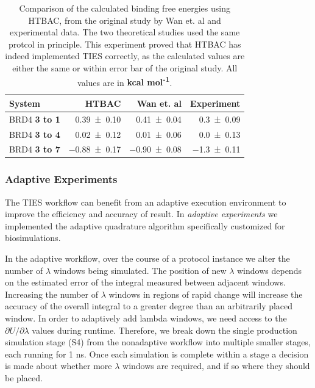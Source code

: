 \begin{table}
  \centering
  \begin{tabular}{l@{\hskip 1in}r@{\hskip 0.2in}r@{\hskip 0.2in}r}
    \toprule
    System & HTBAC & Wan et. al & Experiment \\
    \midrule
    BRD4 \textbf{3 to 1} & \num{0.39 +- 0.10} &   \num{0.41 +- 0.04} &  \num{0.3 +- 0.09} \\
    BRD4 \textbf{3 to 4} & \num{0.02 +- 0.12} &   \num{0.01 +- 0.06} &  \num{0.0 +- 0.13} \\
    BRD4 \textbf{3 to 7} & \num{-0.88 +- 0.17} &  \num{-0.90 +- 0.08} & \num{-1.3 +- 0.11} \\
    \bottomrule
  \end{tabular}

  \caption{Comparison of the calculated binding free energies using HTBAC, from
  the original study by Wan et. al and experimental data. The two theoretical
  studies used the same protcol in principle. This experiment proved that HTBAC
  has indeed implemented TIES correctly, as the calculated values are either
  the same or within error bar of the original study. All values are in
  \textbf{kcal mol\textsuperscript{-1}}.}
  \label{tab:exp2}


\end{table}


\subsubsection{Adaptive Experiments}

The TIES workflow can benefit from an adaptive execution environment to improve
the efficiency and accuracy of result. In \emph{adaptive experiments} we
implemented the adaptive quadrature algorithm specifically customized for
biosimulations.

In the adaptive workflow, over the course of a protocol instance we alter
the number of $\lambda$ windows being simulated. The position of new $\lambda$
windows depends on the estimated error of the integral measured between
adjacent windows. Increasing the number of $\lambda$ windows in regions of
rapid change will increase the accuracy of the overall integral to a greater
degree than an
arbitrarily placed window. In order to adaptively add lambda windows, we need
access to the $\partial U/\partial\lambda$ values during runtime. Therefore, 
we break down the single production simulation stage (S4) from the nonadaptive 
workflow into multiple smaller stages, each running for 1 ns. Once each 
simulation is complete within a stage a decision is made about whether more 
$\lambda$ windows are required, and if so where they should be placed.

